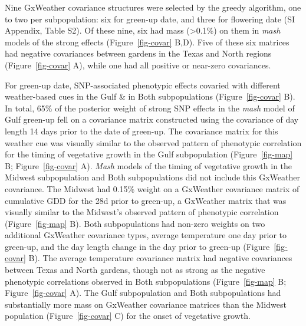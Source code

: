 \documentclass[
  9pt,
  twocolumn,
  twoside]{pnas-new}
\begin{document}
Nine GxWeather covariance structures were selected by the greedy
algorithm, one to two per subpopulation: six for green-up date, and
three for flowering date (SI Appendix, Table S2). Of these nine, six had
mass (\textgreater0.1\%) on them in \emph{mash} models of the strong
effects (Figure~\ref{fig-covar} B,D). Five of these six matrices had
negative covariances between gardens in the Texas and North regions
(Figure~\ref{fig-covar} A), while one had all positive or near-zero
covariances.

For green-up date, SNP-associated phenotypic effects covaried with
different weather-based cues in the Gulf \& in Both subpopulations
(Figure~\ref{fig-covar} B). In total, 65\% of the posterior weight of
strong SNP effects in the \emph{mash} model of Gulf green-up fell on a
covariance matrix constructed using the covariance of day length 14 days
prior to the date of green-up. The covariance matrix for this weather
cue was visually similar to the observed pattern of phenotypic
correlation for the timing of vegetative growth in the Gulf
subpopulation (Figure~\ref{fig-map} B; Figure~\ref{fig-covar} A).
\emph{Mash} models of the timing of vegetative growth in the Midwest
subpopulation and Both subpopulations did not include this GxWeather
covariance. The Midwest had 0.15\% weight on a GxWeather covariance
matrix of cumulative GDD for the 28d prior to green-up, a GxWeather
matrix that was visually similar to the Midwest's observed pattern of
phenotypic correlation (Figure~\ref{fig-map} B). Both subpopulations had
non-zero weights on two additional GxWeather covariance types, average
temperature one day prior to green-up, and the day length change in the
day prior to green-up (Figure~\ref{fig-covar} B). The average
temperature covariance matrix had negative covariances between Texas and
North gardens, though not as strong as the negative phenotypic
correlations observed in Both subpopulations (Figure~\ref{fig-map} B;
Figure~\ref{fig-covar} A). The Gulf subpopulation and Both
subpopulations had substantially more mass on GxWeather covariance
matrices than the Midwest population (Figure~\ref{fig-covar} C) for the
onset of vegetative growth.
\end{document}
